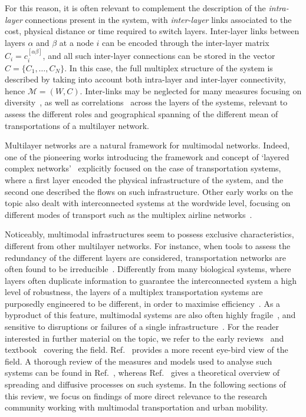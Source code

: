 For this reason, it is often relevant to complement the description of the \textit{intra-layer} connections present in the system, with \textit{inter-layer} links associated to the cost, physical distance or time required to switch layers. Inter-layer links between layers $\alpha$ and $\beta$ at a node $i$ can be encoded through the inter-layer matrix $C_i=c_i^{[\alpha \beta]}$, and all such inter-layer connections can be stored in the vector $ C = \{C_1, \ldots, C_N\}$. In this case, the full multiplex structure of the system is described by taking into account both intra-layer and inter-layer connectivity, hence $\mathcal M = (W,  C)$. Inter-links may be neglected for many measures focusing on diversity~\cite{battiston2014structural}, as well as correlations~\cite{nicosia2015measuring} across the layers of the systems, relevant to assess the different roles and geographical spanning of the different mean of transportations of a multilayer network. 

Multilayer networks are a natural framework for multimodal networks. Indeed, one of the pioneering works introducing the framework and concept of `layered complex networks'~\cite{kurant2006layered} explicitly focused on the case of transportation systems, where a first layer encoded the physical infrastructure of the system, and the second one described the flows on such infrastructure. Other early works on the topic also dealt with interconnected systems at the wordwide level, focusing on different modes of transport such as the multiplex airline networks~\cite{cardillo2013emergence}.

Noticeably, multimodal infrastructures seem to possess exclusive characteristics, different from other multilayer networks. For instance, when tools to assess the redundancy of the different layers are considered, transportation networks are often found to be irreducible~\cite{dedomenico2015structural}. Differently from many biological systems, where layers often duplicate information to guarantee the interconnected system a high level of robustness, the layers of a multiplex transportation systems are purposedly engineered to be different, in order to maximise efficiency~\cite{latora2001efficient}. As a byproduct of this feature, multimodal systems are also often highly fragile~\cite{buldyrev2010catastrophic}, and sensitive to disruptions or failures of a single infrastructure~\cite{dedomenico2014interconnected}. For the reader interested in further material on the topic, we refer to the early reviews~\cite{boccaletti2014structure, kivela2014multilayer} and textbook~\cite{bianconi2018multilayer} covering the field. Ref.~\cite{aleta2019multilayer} provides a more recent eye-bird view of the field. A thorough review of the measures and models used to analyse such systems can be found in Ref.~\cite{battiston2017new}, whereas Ref.~\cite{dedomenico2016physics} gives a theoretical overview of spreading and diffusive processes on such systems. In the following sections of this review, we focus on findings of more direct relevance to the research community working with multimodal transportation and urban mobility. 


